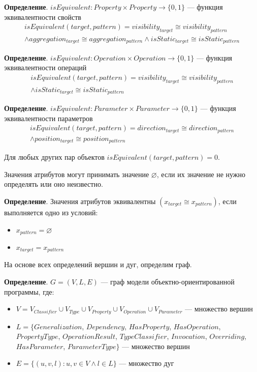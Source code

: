 \textbf{Определение}. $isEquivalent: Property \times Property \to \{ 0, 1 \}$
--- функция эквивалентности свойств
%
\begin{multline*}
isEquivalent(target, pattern) = visibility_{target} \cong visibility_{pattern} \\
\land aggregation_{target} \cong aggregation_{pattern} \land isStatic_{target} \cong isStatic_{pattern}
\end{multline*}

\textbf{Определение}. $isEquivalent: Operation \times Operation \to \{ 0, 1 \}$
--- функция эквивалентности операций
%
\begin{multline*}
isEquivalent(target, pattern) = visibility_{target} \cong visibility_{pattern} \\
\land isStatic_{target} \cong isStatic_{pattern}
\end{multline*}

\textbf{Определение}. $isEquivalent: Parameter \times Parameter \to \{ 0, 1 \}$
--- функция эквивалентности параметров
%
\begin{multline*}
isEquivalent(target, pattern) = direction_{target} \cong direction_{pattern} \\
\land position_{target} \cong position_{pattern}
\end{multline*}

Для любых других пар объектов $isEquivalent(target, pattern) = 0$.

Значения атрибутов могут принимать значение $\varnothing$,
если их значение не нужно определять или оно неизвестно.

\textbf{Определение}. Значения атрибутов эквивалентны
$(x_{target} \cong x_{pattern})$, если выполняется одно из условий:
\begin{itemize}
\item $x_{pattern} = \varnothing$
\item $x_{target} = x_{pattern}$
\end{itemize}

На основе всех определений вершин и дуг, определим граф.

\textbf{Определение}. $G = (V, L, E)$ --- граф модели объектно-ориентированной программы, где:
\begin{itemize}
\item $V = V_{Classifier} \cup V_{Type} \cup V_{Property} \cup V_{Operation} \cup V_{Parameter}$
--- множество вершин
\item $L = \{ Generalization$, $Dependency$, $HasProperty$, $HasOperation$,
$PropertyType$, $OperationResult$, $TypeClassifier$, $Invocation$, $Overriding$,
$HasParameter$, $ParameterType \}$  --- множество вершин
\item $E = \{ (u, v, l) : u, v \in V \land l \in L \}$ --- множество дуг
\end{itemize}

